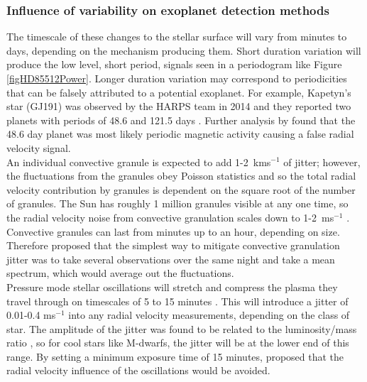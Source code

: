 \subsubsection{Influence of variability on exoplanet detection methods}
\label{secVarInfluence}
The timescale of these changes to the stellar surface will vary from minutes to days, depending on the mechanism producing them. Short duration variation will produce the low level, short period, signals seen in a periodogram like Figure\,\ref{figHD85512Power}. Longer duration variation may correspond to periodicities that can be falsely attributed to a potential exoplanet. For example, Kapetyn's star (GJ191) was observed by the HARPS team in 2014 and they reported two planets with periods of 48.6 and 121.5 days \citep{2014Anglada-Escude}. Further analysis by \citet{2015Robertson} found that the 48.6 day planet was most likely periodic magnetic activity causing a false radial velocity signal.\\

An individual convective granule is expected to add 1-2~kms$^{-1}$ of jitter; however, the fluctuations from the granules obey Poisson statistics and so the total radial velocity contribution by granules is dependent on the square root of the number of granules. The Sun has roughly 1 million granules visible at any one time, so the radial velocity noise from convective granulation scales down to 1-2~ms$^{-1}$ \citep{2003Lindegren}. Convective granules can last from minutes up to an hour, depending on size. Therefore \citet{2008Otoole} proposed that the simplest way to mitigate convective granulation jitter was to take several observations over the same night and take a mean spectrum, which would average out the fluctuations.\\

Pressure mode stellar oscillations will stretch and compress the plasma they travel through on timescales of 5 to 15 minutes \citep{2000Schrijver}. This will introduce a jitter of 0.01-0.4 ms$^{-1}$ into any radial velocity measurements, depending on the class of star. The amplitude of the jitter was found to be related to the luminosity/mass ratio \citep{2004Christensen-Dalsgaard}, so for cool stars like M-dwarfs, the jitter will be at the lower end of this range. By setting a minimum exposure time of 15 minutes, \citet{2011Dumusque} proposed that the radial velocity influence of the oscillations would be avoided.\\ 

